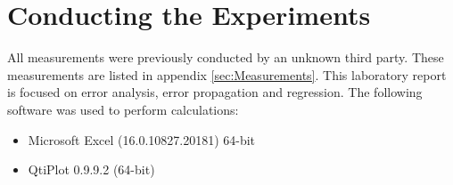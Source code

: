 \section{Conducting the Experiments}
\label{sec:Conducting_the_Experiments}
All measurements were previously conducted by an unknown third party. These measurements are listed in appendix \ref{sec:Measurements}. This laboratory report is focused on error analysis, error propagation and regression. The following software was used to perform calculations:
\begin{itemize}
	\item{Microsoft Excel (16.0.10827.20181) 64-bit}
	\item{QtiPlot 0.9.9.2 (64-bit)}
\end{itemize}
